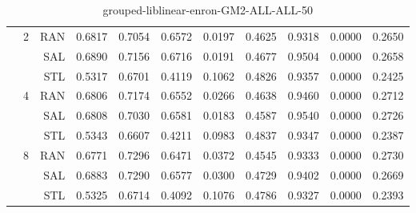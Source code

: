 \begin{center}
\begin{table}[htbp]
\begin{center}
\begin{tabular}{ | r | r | r | r | r | r | r | r | r | r | r |}
 & \multirow{3}{*}{2} & RAN & 0.6817 & 0.7054 & 0.6572 & 0.0197 & 0.4625 & 0.9318 & 0.0000 & 0.2650\\ \cline{3-11}
 &   & SAL & 0.6890 & 0.7156 & 0.6716 & 0.0191 & 0.4677 & 0.9504 & 0.0000 & 0.2658\\ \cline{3-11}
 &   & STL & 0.5317 & 0.6701 & 0.4119 & 0.1062 & 0.4826 & 0.9357 & 0.0000 & 0.2425\\ \cline{2-11}
 & \multirow{3}{*}{4} & RAN & 0.6806 & 0.7174 & 0.6552 & 0.0266 & 0.4638 & 0.9460 & 0.0000 & 0.2712\\ \cline{3-11}
 &   & SAL & 0.6808 & 0.7030 & 0.6581 & 0.0183 & 0.4587 & 0.9540 & 0.0000 & 0.2726\\ \cline{3-11}
 &   & STL & 0.5343 & 0.6607 & 0.4211 & 0.0983 & 0.4837 & 0.9347 & 0.0000 & 0.2387\\ \cline{2-11}
 & \multirow{3}{*}{8} & RAN & 0.6771 & 0.7296 & 0.6471 & 0.0372 & 0.4545 & 0.9333 & 0.0000 & 0.2730\\ \cline{3-11}
 &   & SAL & 0.6883 & 0.7290 & 0.6577 & 0.0300 & 0.4729 & 0.9402 & 0.0000 & 0.2669\\ \cline{3-11}
 &   & STL & 0.5325 & 0.6714 & 0.4092 & 0.1076 & 0.4786 & 0.9327 & 0.0000 & 0.2393\\ \cline{2-11}
\hline
\end{tabular}
\caption{grouped-liblinear-enron-GM2-ALL-ALL-50}
\end{center}
 \end{table}
\end{center}

